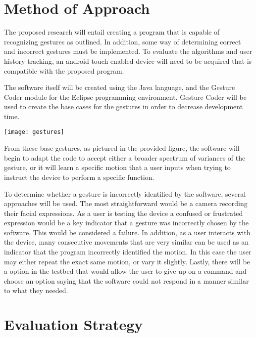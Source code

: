 \documentclass[11pt]{article}
\begin{document}
\vspace*{-.2in}
\section{Method of Approach}
\label{sec:method}
\vspace*{-.1in}

The proposed research will entail creating a program that is capable of recognizing gestures as outlined. In addition, some way of determining correct and incorrect gestures must be implemented. To evaluate the algorithms and user history tracking, an android touch enabled device will need to be acquired that is compatible with the proposed program.

The software itself will be created using the Java language, and the Gesture Coder module for the Eclipse programming environment. Gesture Coder will be used to create the base cases for the gestures in order to decrease development time.

\begin{center}
\texttt{[image: gestures]}
\end{center}

From these base gestures, as pictured in the provided figure, the software will begin to adapt the code to accept either a broader spectrum of variances of the gesture, or it will learn a specific motion that a user inputs when trying to instruct the device to perform a specific function.

To determine whether a gesture is incorrectly identified by the software, several approaches will be used. The most straightforward would be a camera recording their facial expressions. As a user is testing the device a confused or frustrated expression would be a key indicator that a gesture was incorrectly chosen by the software. This would be considered a failure. In addition, as a user interacts with the device, many consecutive movements that are very similar can be used as an indicator that the program incorrectly identified the motion. In this case the user may either repeat the exact same motion, or vary it slightly. Lastly, there will be a option in the testbed that would allow the user to give up on a command and choose an option saying that the software could not respond in a manner similar to what they needed.


\vspace*{-.2in}
\section{Evaluation Strategy}
\label{sec:evaluate}
\vspace*{-.1in}
\end{document}
